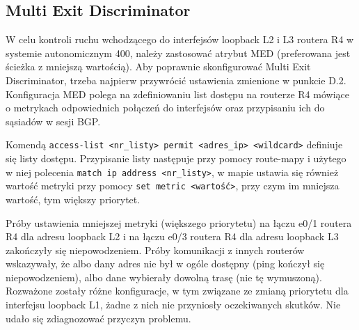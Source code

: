 \documentclass[a4paper,12pt,notitlepage]{article}
\begin{document}
\subsection{Multi Exit Discriminator}

W celu kontroli ruchu wchodzącego do interfejsów loopback L2 i L3 routera R4 w systemie autonomicznym 400, należy zastosować atrybut MED (preferowana jest ścieżka z mniejszą wartością). Aby poprawnie skonfigurować Multi Exit Discriminator, trzeba najpierw przywrócić ustawienia zmienione w punkcie D.2. Konfiguracja MED polega na zdefiniowaniu list dostępu na routerze R4 mówiące o metrykach odpowiednich połączeń do interfejsów oraz przypisaniu ich do sąsiadów w sesji BGP.

Komendą \texttt{access-list <nr_listy> permit <adres_ip> <wildcard>} definiuje się listy dostępu. Przypisanie listy następuje przy pomocy route-mapy i użytego w niej polecenia  \texttt{match ip address <nr_listy>}, w mapie ustawia się również wartość metryki przy pomocy  \texttt{set metric <wartość>}, przy czym im mniejsza wartość, tym większy priorytet.

Próby ustawienia mniejszej metryki (większego priorytetu) na łączu e0/1 routera R4 dla adresu loopback L2 i na łączu e0/3 routera R4 dla adresu loopback L3 zakończyły się niepowodzeniem. Próby komunikacji z innych routerów wskazywały, że albo dany adres nie był w ogóle dostępny (ping kończył się niepowodzeniem), albo dane wybierały dowolną trasę (nie tę wymuszoną). Rozważone zostały różne konfiguracje, w tym związane ze zmianą priorytetu dla interfejsu loopback L1, żadne z nich nie przyniosły oczekiwanych skutków. Nie udało się zdiagnozować przyczyn problemu.
\end{document}
